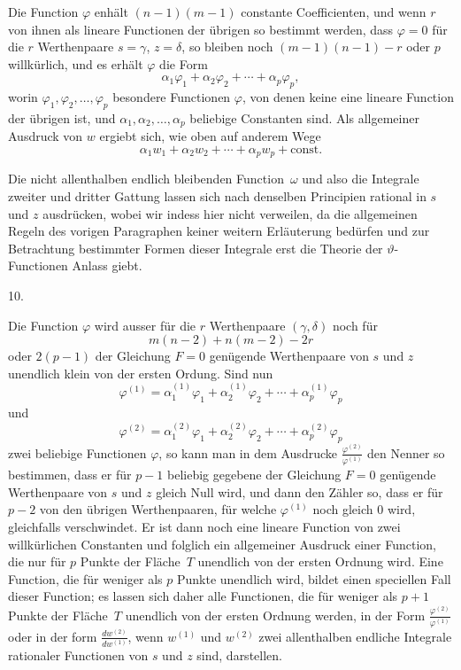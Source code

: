 \documentclass[a4paper,12pt,leqno]{article}
\begin{document}
Die Function $\varphi$ enh\"{a}lt $(n - 1)(m - 1)$ constante
Coefficienten, und wenn $r$ von ihnen als lineare Functionen der
\"{u}brigen so bestimmt werden, dass $\varphi = 0$ f\"{u}r die
$r$ Werthenpaare $s = \gamma$, $z = \delta$, so bleiben noch
$(m - 1)(n - 1) - r$ oder $p$ willk\"{u}rlich, und es erh\"{a}lt
$\varphi$ die Form
\[ \alpha_1 \varphi_1 + \alpha_2 \varphi_2 + \cdots
      + \alpha_p \varphi_p,\]
worin $\varphi_1, \varphi_2,\ldots, \varphi_p$ besondere
Functionen $\varphi$, von denen keine eine lineare Function der
\"{u}brigen ist, und $\alpha_1, \alpha_2,\ldots, \alpha_p$
beliebige Constanten sind.  Als allgemeiner Ausdruck von $w$
ergiebt sich, wie oben auf anderem Wege
\[ \alpha_1 w_1 + \alpha_2 w_2 + \cdots + \alpha_p w_p
      + \mbox{const.} \]

Die nicht allenthalben endlich bleibenden Function~$\omega$ und
also die Integrale zweiter und dritter Gattung lassen sich nach
denselben Principien rational in $s$ und $z$ ausdr\"{u}cken,
wobei wir indess hier nicht verweilen, da die allgemeinen Regeln
des vorigen Paragraphen keiner weitern Erl\"{a}uterung
bed\"{u}rfen und zur Betrachtung bestimmter Formen dieser
Integrale erst die Theorie der $\vartheta$-Functionen Anlass
giebt.

\medbreak

\centerline{10.}

\nobreak\medskip

Die Function $\varphi$ wird ausser f\"{u}r die $r$ Werthenpaare
$(\gamma, \delta)$ noch f\"{u}r
\[ m(n - 2) + n(m - 2)- 2r \]
oder $2(p - 1)$ der Gleichung $F = 0$ gen\"{u}gende Werthenpaare
von $s$ und $z$ unendlich klein von der ersten Ordung.  Sind nun
\[ \varphi^{(1)}
   = \alpha_1^{(1)} \varphi_1 + \alpha_2^{(1)} \varphi_2 + \cdots
      + \alpha_p^{(1)} \varphi_p \]
und
\[ \varphi^{(2)}
   = \alpha_1^{(2)} \varphi_1 + \alpha_2^{(2)} \varphi_2 + \cdots
      + \alpha_p^{(2)} \varphi_p \]
zwei beliebige Functionen $\varphi$, so kann man in dem Ausdrucke
$\displaystyle\frac{\varphi^{(2)}}{\varphi^{(1)}}$
den Nenner so bestimmen, dass er f\"{u}r $p - 1$ beliebig
gegebene der Gleichung $F = 0$ gen\"{u}gende Werthenpaare von $s$
und $z$ gleich Null wird, und dann den Z\"{a}hler so, dass er
f\"{u}r $p - 2$ von den \"{u}brigen Werthenpaaren, f\"{u}r welche
$\varphi^{(1)}$ noch gleich $0$ wird, gleichfalls verschwindet.
Er ist dann noch eine lineare Function von zwei willk\"{u}rlichen
Constanten und folglich ein allgemeiner Ausdruck einer Function,
die nur f\"{u}r $p$ Punkte der Fl\"{a}che~$T$ unendlich von der
ersten Ordnung wird.  Eine Function, die f\"{u}r weniger als $p$
Punkte unendlich wird, bildet einen speciellen Fall dieser
Function; es lassen sich daher alle Functionen, die f\"{u}r
weniger als $p + 1$ Punkte der Fl\"{a}che~$T$ unendlich von der
ersten Ordnung werden, in der Form
$\displaystyle\frac{\varphi^{(2)}}{\varphi^{(1)}}$
oder in der form
$\displaystyle\frac{dw^{(2)}}{dw^{(1)}}$,
wenn $w^{(1)}$ und $w^{(2)}$ zwei allenthalben endliche Integrale
rationaler Functionen von $s$ und $z$ sind, darstellen.
\end{document}
